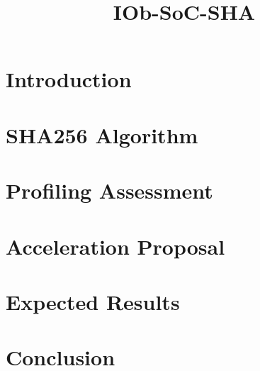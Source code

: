\documentclass{plan}
\title{IOb-SoC-SHA}
\begin{document}
\maketitle
\cleardoublepage
\tableofcontents
\listoftables
\listoffigures
\cleardoublepage

\section{Introduction}
\label{sec:intro}


\section{SHA256 Algorithm}
\label{sec:sha256}


\section{Profiling Assessment}
\label{sec:profiling}


\section{Acceleration Proposal}
\label{sec:accel_proposal}


\section{Expected Results}
\label{sec:expected_results}


\section{Conclusion}
\label{sec:conclusion}


{}


\end{document}
